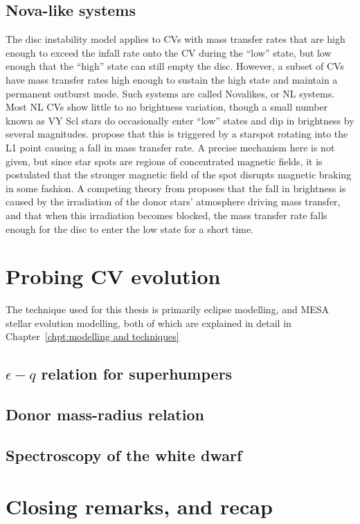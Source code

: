 \subsection{Nova-like systems}

The disc instability model applies to CVs with mass transfer rates that are high enough to exceed the infall rate onto the CV during the ``low'' state, but low enough that the ``high'' state can still empty the disc. However, a subset of CVs have mass transfer rates high enough to sustain the high state and maintain a permanent outburst mode. Such systems are called Novalikes, or NL systems. Most NL CVs show little to no brightness variation, though a small number known as VY Scl stars do occasionally enter ``low'' states and dip in brightness by several magnitudes. \citet{livio1994} propose that this is triggered by a starspot rotating into the L1 point causing a fall in mass transfer rate. A precise mechanism here is not given, but since star spots are regions of concentrated magnetic fields, it is postulated that the stronger magnetic field of the spot disrupts magnetic braking in some fashion. A competing theory from \citet{wu1995} proposes that the fall in brightness is caused by the irradiation of the donor stars' atmosphere driving mass transfer, and that when this irradiation becomes blocked, the mass transfer rate falls enough for the disc to enter the low state for a short time.




\section{Probing CV evolution}
The technique used for this thesis is primarily eclipse modelling, and MESA stellar evolution modelling, both of which are explained in detail in Chapter~\ref{chpt:modelling and techniques}

\subsection{$\epsilon - q$ relation for superhumpers}

\subsection{Donor mass-radius relation}

\subsection{Spectroscopy of the white dwarf}


\section{Closing remarks, and recap}





